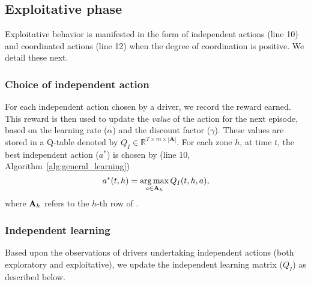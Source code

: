 \subsection{Exploitative phase}
Exploitative behavior is manifested in the form of independent
    actions (line 10) and coordinated actions (line 12) when the degree of
    coordination is positive.
We detail these next.

\subsubsection{Choice of independent action}
For each independent action chosen by a driver, we record the  
    reward earned. 
This reward is then used to update the \emph{value} of the action for the 
    next episode, based on the learning rate ($\alpha$) and the
    discount factor ($\gamma$). 
These values are stored in a Q-table denoted by 
    $Q_I \in \mathbb{R}^{T \times m \times |\textbf{A}|}$.
For each zone $h$, at time $t$, the best independent action ($a^*$) 
 is chosen by (line 10, Algorithm~\ref{alg:general_learning})
    \begin{equation*}
        a^*(t, h) = \operatorname*{arg\,max}_{a \in {{\ensuremath{\mathbf{A}}}}_h}Q_I(t, h, a), 
    \end{equation*}
    where ${{\mathbf{A}}}_h$ refers to the $h$-th row of {\actionmatrix}.

\subsubsection{Independent learning}
Based upon the observations of drivers undertaking independent actions (both
    exploratory and exploitative), we
    update the independent learning matrix ($Q_I$) as
    described below.

